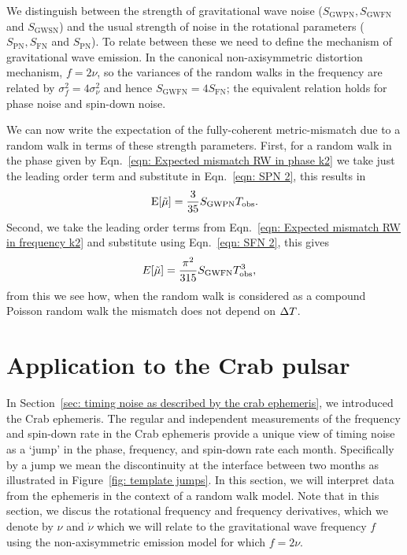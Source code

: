 \documentclass[../full_thesis/full_thesis.tex]{subfiles}
\begin{document}
{We distinguish between the strength of gravitational wave noise
($S_{\textrm{GWPN}}, S_{\textrm{GWFN}}$ and $S_{\textrm{GWSN}}$) and the
usual strength of noise in the rotational parameters ($S_{\textrm{PN}},
S_{\textrm{FN}}$ and $S_{\textrm{PN}}$). To relate between these we need to
define the mechanism of gravitational wave emission. In the canonical
non-axisymmetric distortion mechanism, $f = 2\nu$, so the variances of the
random walks in the frequency are related by $\sigma_{f}^{2} = 4
\sigma_{\nu}^{2}$ and hence $S_{\textrm{GWFN}} = 4S_{\textrm{FN}}$; the
equivalent relation holds for phase noise and spin-down noise.

We can now write the expectation of the fully-coherent metric-mismatch due to
a random walk in terms of these strength parameters. First, for a random walk
in the phase given by Eqn.~\eqref{eqn: Expected mismatch RW in phase k2} we
take just the leading order term and substitute in Eqn.~\eqref{eqn: SPN 2},
this results in
\begin{align}
\textrm{E}[\tilde{\mu}] = \frac{3}{35} S_{\textrm{GWPN}} T_{\mathrm{obs}}.
\label{eqn: mu prediction phase}
\end{align}
Second, we take the leading order terms from Eqn.~\eqref{eqn: Expected mismatch RW in
frequency k2} and substitute using Eqn.~\eqref{eqn: SFN 2}, this gives
\begin{align}
E[\tilde{\mu}] & = \frac{\pi^{2}}{315} S_{\textrm{GWFN}} T_{\mathrm{obs}}^{3},
\label{eqn: mu prediction}
\end{align}
from this we see how, when the random walk is considered as a compound Poisson
random walk the mismatch does not depend on $\Delta T$.

\section{Application to the Crab pulsar}
\label{sec: application to the crab}
In Section~\ref{sec: timing noise as described by the crab ephemeris}, we
introduced the Crab ephemeris.  The regular and independent measurements of the
frequency and spin-down rate in the Crab ephemeris provide a unique view of
timing noise as a `jump' in the phase, frequency, and spin-down rate each
month. Specifically by a jump we mean the discontinuity at the interface
between two months as illustrated in Figure~\ref{fig: template jumps}. In this
section, we will interpret data from the ephemeris in the context of a random
walk model. Note that in this section,
we discus the rotational frequency and frequency derivatives, which we denote
by $\nu$ and $\dot{\nu}$ which we will relate to the gravitational wave
frequency $f$ using the non-axisymmetric emission model for which $f=2\nu$.

}
\end{document}
